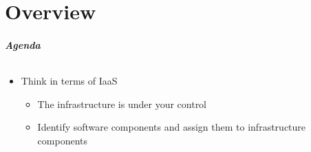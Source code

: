 \part{Overview}

\begin{frame}
\frametitle{Agenda}
\framesubtitle{}
\begin{itemize}
\item Think in terms of IaaS
  \begin{itemize}
  \item The infrastructure is under your control
  \item Identify software components and assign them to infrastructure components
  \end{itemize}
\end{itemize}
\end{frame}

